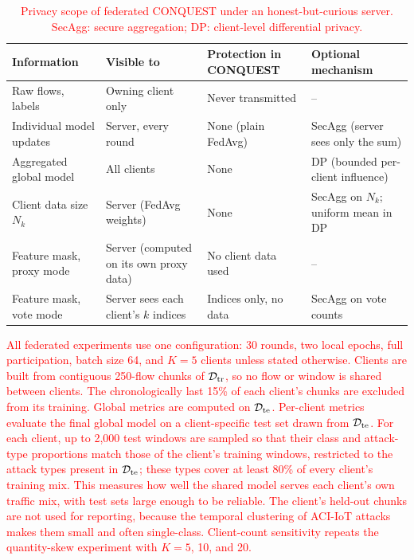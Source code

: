 \documentclass[conference]{IEEEtran}
\begin{document}
\begin{table}[!t]
\centering
\scriptsize
\caption{\textcolor{red}{Privacy scope of federated CONQUEST
under an honest-but-curious server. SecAgg: secure aggregation; DP:
client-level differential privacy.}}
\label{tab:privacy_scope}
\color{red}
\setlength{\tabcolsep}{3pt}
\renewcommand{\arraystretch}{1.08}
\begin{tabular}{p{1.7cm} p{1.6cm} p{1.75cm} p{1.75cm}}
\hline\toprule
\textbf{Information} & \textbf{Visible to} & \textbf{Protection in CONQUEST} & \textbf{Optional mechanism} \\
\hline\toprule
Raw flows, labels & Owning client only & Never transmitted & -- \\
Individual model updates & Server, every round & None (plain FedAvg) & SecAgg (server sees only the sum) \\
Aggregated global model & All clients & None & DP (bounded per-client influence) \\
Client data size $N_k$ & Server (FedAvg weights) & None & SecAgg on $N_k$; uniform mean in DP \\
Feature mask, proxy mode & Server (computed on its own proxy data) & No client data used & -- \\
Feature mask, vote mode & Server sees each client's $k$ indices & Indices only, no data & SecAgg on vote counts \\
\hline\toprule
\end{tabular}
\end{table}

\textcolor{red}{All federated experiments use one
configuration: 30 rounds, two local epochs, full participation, batch
size 64, and $K=5$ clients unless stated otherwise. Clients are built
from contiguous 250-flow chunks of $\mathcal{D}_{\rm tr}$, so no flow
or window is shared between clients. The chronologically last 15\% of
each client's chunks are excluded from its training. Global metrics
are computed on $\mathcal{D}_{\rm te}$.}
\textcolor{red}{Per-client metrics
evaluate the final global model on a client-specific test set drawn
from $\mathcal{D}_{\rm te}$. For each client, up to 2{,}000 test
windows are sampled so that their class and attack-type proportions
match those of the client's training windows, restricted to the
attack types present in $\mathcal{D}_{\rm te}$; these types cover at
least 80\% of every client's training mix. This measures how well the
shared model serves each client's own traffic mix, with test sets
large enough to be reliable. The client's held-out chunks are not
used for reporting, because the temporal clustering of ACI-IoT
attacks makes them small and often single-class. Client-count
sensitivity repeats the quantity-skew experiment with $K=5$, 10, and
20.}
\end{document}

